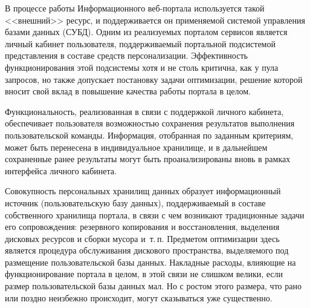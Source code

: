 \begin{multicols}{2}
  В процессе работы Информационного веб-пор\-та\-ла используется такой <<внешний>> 
ресурс, и поддерживается он применяемой системой управ\-ле\-ния базами данных (СУБД). 
Одним из реализуемых порталом сервисов является личный кабинет пользователя, 
поддерживаемый портальной под\-сис\-те\-мой представления в составе средств персонализации. 
Эффективность функционирования этой подсистемы хотя и не столь критична, как у пула 
запросов, но также допускает постановку задачи оптимизации, решение которой вносит свой 
вклад в повышение качества работы портала в целом.
  
  Функциональность, реализованная в связи с поддержкой личного кабинета, обеспечивает 
пользователя возможностью сохранения результатов выполнения пользовательской 
команды. Информация, отобранная по заданным критериям, может быть перенесена в 
индивидуальное хранилище, и в дальнейшем сохраненные ранее результаты могут быть 
проанализированы вновь в рамках интерфейса личного кабинета.
  
  Совокупность персональных хранилищ данных образует информационный источник 
(пользовательскую базу данных), поддерживаемый в составе собственного хранилища 
портала, в связи с чем возникают традиционные задачи его сопровождения: резервного 
копирования и восстановления, выделения дисковых ресурсов и сборки мусора и~т.\,п.\linebreak 
Предметом оптимизации здесь является процедура обслуживания дискового пространства, 
вы\-де\-ля\-емо\-го под размещение пользовательской базы данных. Накладные расходы, 
влияющие на функционирование портала в целом, в этой связи не\linebreak
 слишком велики, если 
размер пользовательской базы данных мал. Но с ростом этого размера, что рано или 
поздно неизбежно происходит, могут сказываться уже существенно.
  

\end{multicols}
